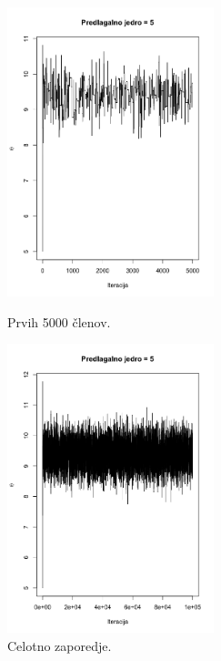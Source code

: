 \documentclass[a4paper,11pt]{article}
\begin{document}
    \begin{figure}[ht!]
        \begin{minipage}{0.5\textwidth}
            \centering
            \includegraphics[width = 60mm]{Slike/4_1e_S_s.png}
            \caption{Prvih 5000 členov.}
        \end{minipage}
        \begin{minipage}{0.5\textwidth}
            \centering
            \includegraphics[width = 60mm]{Slike/4_1e_celotno_s.png}
            \caption{Celotno zaporedje.}
        \end{minipage}
    \end{figure}
\newpage
\end{document}

